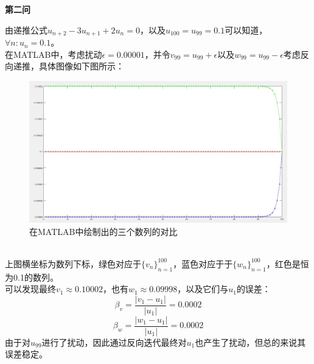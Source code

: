 \documentclass[12pt]{article}
\begin{document}
    \begin{center}
    	\textbf{第二问}
    \end{center}
	由递推公式$u_{n+2}-3u_{n+1}+2u_{n}=0$，以及$u_{100}=u_{99}=0.1$可以知道，${\forall}n:u_{n}=0.1$。
	\\
	在MATLAB中，考虑扰动$\epsilon=0.00001$，并令$v_{99}=u_{99}+\epsilon$以及$w_{99}=u_{99}-\epsilon$考虑反向递推，具体图像如下图所示：
	\begin{figure}[h]
		\centering
		\includegraphics[width=1\textwidth]{图2}
		\caption{在MATLAB中绘制出的三个数列的对比}
	\end{figure}
	\\
	上图横坐标为数列下标，绿色对应于$\{v_n\}_{n=1}^{100}$，蓝色对应于于$\{w_n\}_{n=1}^{100}$，红色是恒为0.1的数列。
	\\
	可以发现最终$v_{1}\approx0.10002$，也有$w_{1}\approx0.09998$，以及它们与$u_{1}$的误差：$$\beta_{v}=\frac{\vert v_{1}-u_{1} \vert}{\vert u_{1} \vert}=0.0002$$ $$\beta_{w}=\frac{\vert w_{1}-u_{1} \vert}{\vert u_{1} \vert}=0.0002$$
	由于对$u_{99}$进行了扰动，因此通过反向迭代最终对$u_{1}$也产生了扰动，但总的来说其误差稳定。
	
\end{document}
